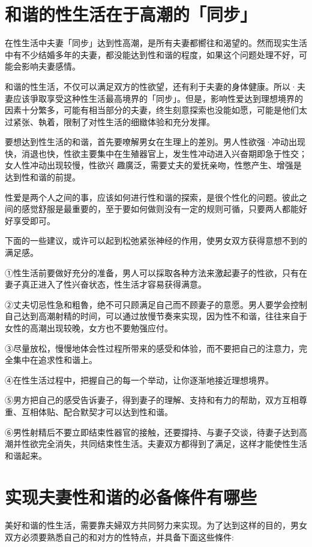\documentclass[12pt,UTF8]{ctexbook}
\begin{document}
\section{和谐的性生活在于高潮的「同步」}

在性生活中夫妻「同步」达到性高潮，是所有夫妻都嚮往和渴望的。然而现实生活中有不少结婚多年的夫妻，都没能达到性和谐的程度，如果这个问题处理不好，可能会影响夫妻感情。

和谐的性生活，不仅可以满足双方的性欲望，还有利于夫妻的身体健康。所以·夫妻应该爭取享受这种性生活最高境界的「同步」。但是，影响性爱达到理想境界的因素十分繁多，可能有相当部分的夫妻，终生刻意探索也没能如愿，可能是他们太过紧张、執着，限制了对性生活的细緻体验和充分发揮。

要想达到性生活的和谐，首先要嘹解男女在生理上的差別。男人性欲强·冲动出现快，消退也快，性欲主要集中在生殖器官上，发生性冲动进入兴奋期即急于性交；女人性冲动出现较慢，性欲兴
趣廣泛，需要丈夫的爱抚亲吻，性憋产生、增强是达到性和谐的前提。

性爱是两个人之间的事，应该如何进行性和谐的探索，是很个性化的问题。彼此之间的感觉舒服是最重要的，至于要如何做则没有一定的规则可循，只要两人都能好好享受即可。

下面的一些建议，或许可以起到松弛紧张神经的作用，使男女双方获得意想不到的满足感。

①性生活前要做好充分的准备，男人可以採取各种方法来激起妻子的性欲，只有在妻子真正进入了性兴奋状态，性生活才容易获得满意。

②丈夫切忌性急和粗魯，绝不可只顾满足自己而不顾妻子的意愿。男人要学会控制自己达到高潮射精的时间，可以通过放慢节奏来实现，因为性不和谐，往往来自于女性的高潮出现较晚，女方也不要勉强应付。

③尽量放松，慢慢地体会性过程所带来的感受和体验，而不要把自己的注意力，完全集中在追求性和谐上。

④在性生活过程中，把握自己的每一个举动，让你逐渐地接近理想境界。

⑤男方把自己的感受告诉妻子，得到妻子的理解、支持和有力的帮助，双方互相尊重、互相体贴、配合默契才可以达到性和谐。

⑥男性射精后不要立即结束性器官的接触，还要撐持、与妻子交谈，待妻子达到高潮并性欲完全消失，共同结束性生活。夫妻双方都得到了满足，这样才能使性生活和谐起来。

\section{实现夫妻性和谐的必备條件有哪些}

美好和谐的性生活，需要靠夫婦双方共同努力来实现。为了达到这样的目的，男女双方必须要熟悉自己的和对方的性特点，并具备下面这些條件:
\end{document}
